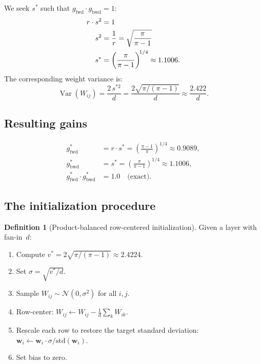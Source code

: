 \documentclass[11pt,a4paper]{article}
\theoremstyle{definition}
\newtheorem{definition}[theorem]{Definition}
\newcommand{\Var}{\operatorname{Var}}
\begin{document}
We seek $s^{\ast}$ such that $g_{\mathrm{fwd}} \cdot g_{\mathrm{bwd}} = 1$:
\begin{align}
  r \cdot s^2 &= 1 \notag \\
  s^2 &= \frac{1}{r} = \sqrt{\frac{\pi}{\pi-1}} \notag \\
  s^{\ast} &= \left(\frac{\pi}{\pi-1}\right)^{\!1/4} \approx 1.1006. \label{eq:s-star}
\end{align}
The corresponding weight variance is:
\begin{equation}\label{eq:v-star}
  \boxed{\;\Var(W_{ij}) = \frac{2\,s^{\ast 2}}{d}
         = \frac{2\sqrt{\pi/(\pi-1)}}{d} \approx \frac{2.422}{d}.\;}
\end{equation}

\subsection{Resulting gains}
\begin{align}
  g_{\mathrm{fwd}}^{\ast} &= r \cdot s^{\ast}
    = \left(\frac{\pi-1}{\pi}\right)^{\!1/4} \approx 0.9089, \label{eq:gfwd-val} \\
  g_{\mathrm{bwd}}^{\ast} &= s^{\ast}
    = \left(\frac{\pi}{\pi-1}\right)^{\!1/4} \approx 1.1006, \label{eq:gbwd-val} \\
  g_{\mathrm{fwd}}^{\ast} \cdot g_{\mathrm{bwd}}^{\ast} &= 1.0 \quad\text{(exact)}. \label{eq:product-val}
\end{align}

\subsection{The initialization procedure}

\begin{definition}[Product-balanced row-centered initialization]
\label{def:init-procedure}
Given a layer with fan-in~$d$:
\begin{enumerate}[nosep]
  \item Compute $v^{\ast} = 2\sqrt{\pi/(\pi-1)} \approx 2.4224$.
  \item Set $\sigma = \sqrt{v^{\ast}/d}$.
  \item Sample $W_{ij} \sim \mathcal{N}(0, \sigma^2)$ for all $i, j$.
  \item Row-center: $W_{ij} \leftarrow W_{ij} - \frac{1}{d}\sum_k W_{ik}$.
  \item Rescale each row to restore the target standard deviation:
        $\bm{w}_i \leftarrow \bm{w}_i \cdot \sigma / \mathrm{std}(\bm{w}_i)$.
  \item Set bias to zero.
\end{enumerate}
\end{definition}
\end{document}
